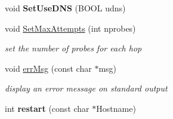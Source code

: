 \begin{CompactItemize}
\item 
\hypertarget{classWinMTRDialog_6b7079438a9f0fa04c29ef10fa9a74d0}{
void \textbf{SetUseDNS} (BOOL udns)}
\label{classWinMTRDialog_6b7079438a9f0fa04c29ef10fa9a74d0}

\item 
\hypertarget{classWinMTRDialog_2789006e17bc99c8366ad5ac01a056d0}{
void \hyperlink{classWinMTRDialog_2789006e17bc99c8366ad5ac01a056d0}{SetMaxAttempts} (int nprobes)}
\label{classWinMTRDialog_2789006e17bc99c8366ad5ac01a056d0}

\begin{CompactList}\small\item\em set the number of probes for each hop \item\end{CompactList}\item 
void \hyperlink{classWinMTRDialog_b7ff762dde134250e3b713d8d56904ae}{errMsg} (const char $\ast$msg)
\begin{CompactList}\small\item\em display an error message on standard output \item\end{CompactList}\item 
\hypertarget{classWinMTRDialog_214d0f569bfbed8035d650f5341967e4}{
int \textbf{restart} (const char $\ast$Hostname)}
\label{classWinMTRDialog_214d0f569bfbed8035d650f5341967e4}

\end{CompactItemize}
